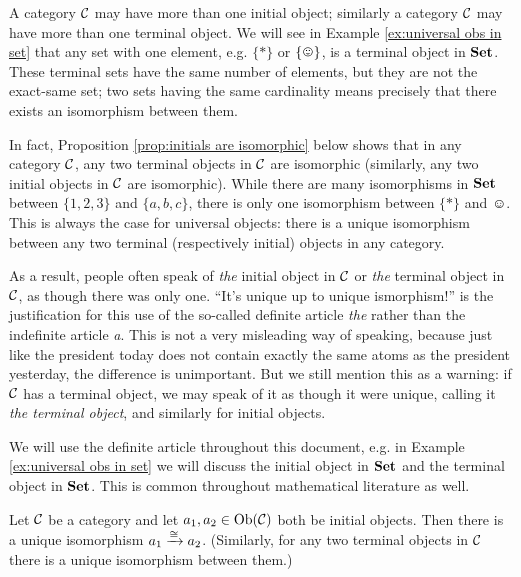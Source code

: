\documentclass[CT4S-EN-RU]{subfiles}
\begin{document}
\begin{blockRUS}
\end{blockRUS}

\begin{warningENG}
A category $\mathcal{C}$ may have more than one initial object; similarly a category $\mathcal{C}$ may have more than one terminal object. We will see in Example \ref{ex:universal obs in set} that any set with one element, e.g. $\{*\}$ or $\singleton$, is a terminal object in ${\bf Set}$. These terminal sets have the same number of elements, but they are not the exact-same set; two sets having the same cardinality means precisely that there exists an isomorphism between them.

In fact, Proposition \ref{prop:initials are isomorphic} below shows that in any category $\mathcal{C}$, any two terminal objects in $\mathcal{C}$ are isomorphic (similarly, any two initial objects in $\mathcal{C}$ are isomorphic). While there are many isomorphisms in ${\bf Set}$ between $\{1,2,3\}$ and $\{a,b,c\}$, there is only one isomorphism between $\{*\}$ and $\smiley$. This is always the case for universal objects: there is a unique isomorphism between any two terminal (respectively initial) objects in any category.

As a result, people often speak of {\em the} initial object in $\mathcal{C}$ or {\em the} terminal object in $\mathcal{C}$, as though there was only one. “It's unique up to unique ismorphism!” is the justification for this use of the so-called definite article {\em the} rather than the indefinite article {\em a}. This is not a very misleading way of speaking, because just like the president today does not contain exactly the same atoms as the president yesterday, the difference is unimportant. But we still mention this as a warning: if $\mathcal{C}$ has a terminal object, we may speak of it as though it were unique, calling it {\em the terminal object}, and similarly for initial objects.

We will use the definite article throughout this document, e.g. in Example \ref{ex:universal obs in set} we will discuss the initial object in ${\bf Set}$ and the terminal object in ${\bf Set}$. This is common throughout mathematical literature as well.
\end{warningENG}

\begin{warningRUS}
\end{warningRUS}

\begin{propositionENG}\label{prop:initials are isomorphic}
Let $\mathcal{C}$ be a category and let $a_1,a_2\in\textnormal{Ob}(\mathcal{C})$ both be initial objects. Then there is a unique isomorphism $a_1\xrightarrow{\cong}a_2$. (Similarly, for any two terminal objects in $\mathcal{C}$ there is a unique isomorphism between them.) 
\end{propositionENG}
\end{document}
